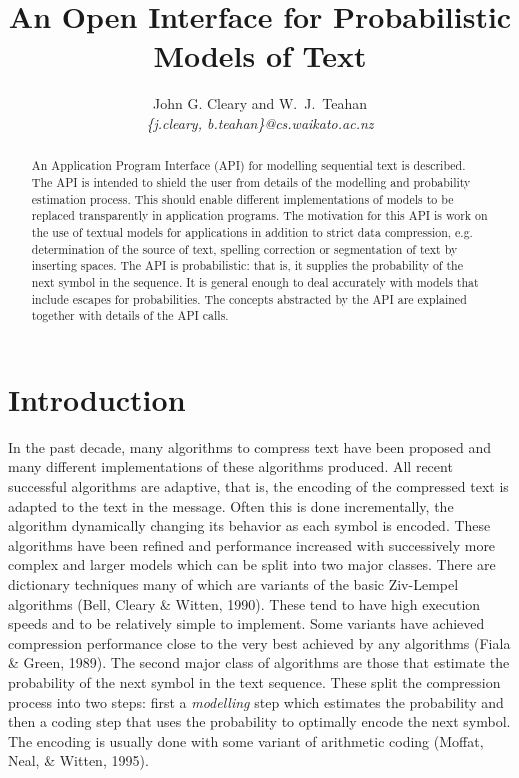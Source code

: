 \documentclass[11pt]{article}
\begin{document}

\title{An Open Interface for Probabilistic Models of Text}
\author{John G. Cleary and W.~J.~Teahan \\[1ex]
     {\em \{j.cleary, b.teahan\}@cs.waikato.ac.nz}
}
\maketitle

\begin{abstract}
An Application Program Interface (API) for modelling sequential text is
described. The API is intended to shield the user from details of the
modelling and probability estimation process. This should enable different
implementations of models to be replaced transparently in application
programs. The motivation for this API is work on the use of textual models
for applications in addition to strict data compression, e.g. determination
of the source of text, spelling correction or segmentation of text by
inserting spaces. The API is probabilistic: that is, it supplies the
probability of the next symbol in the sequence. It is general enough to
deal accurately with models that include escapes for probabilities. The
concepts abstracted by the API are explained together with details of the
API calls.
\end{abstract}

\section{Introduction}

\label{section.introduction}

In the past decade, many algorithms to compress text have been proposed and
many different implementations of these algorithms produced. All
recent successful algorithms are adaptive, that is, the encoding of the
compressed text is adapted to the text in the message. Often this is done
incrementally, the algorithm dynamically changing its behavior as each
symbol is encoded. These algorithms have been refined and performance
increased with successively more complex and larger models which can be
split into two major classes. There are dictionary techniques many of which
are variants of the basic Ziv-Lempel algorithms (Bell, Cleary \& Witten,
1990). These tend to have high execution speeds and to be relatively simple
to implement. Some variants have achieved compression performance close to
the very best achieved by any algorithms (Fiala \& Green, 1989). The second
major class of algorithms are those that estimate the probability of the
next symbol in the text sequence. These split the compression process into
two steps: first a \emph{modelling} step which estimates the probability and
then a coding step that uses the probability to optimally encode the next
symbol. The encoding is usually done with some variant of arithmetic coding
(Moffat, Neal, \& Witten, 1995).
\end{document}
